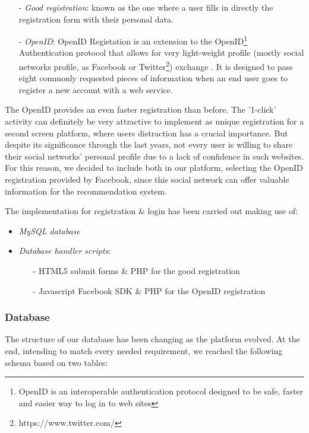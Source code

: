 \documentclass{acm_proc_article-sp}
\begin{document}
\begin{itemize}
  	\item [-]\textit{Good registration}: known as the one where a user fills in directly the registration form with their personal data. 
	\item [-]\textit{OpenID}: OpenID Registation is an extension to the OpenID\footnote{OpenID is an interoperable authentication protocol designed to be safe, faster and easier way to log in to web sites} Authentication protocol that allows for very light-weight profile (mostly social networks profile, as Facebook or Twitter\footnote{https://www.twitter.com/}) exchange . It is designed to pass eight commonly requested pieces of information when an end user goes to register a new account with a web service. 
\end{itemize}

The OpenID provides an even faster registration than before. The '1-click' activity can definitely be very attractive to implement as unique registration for a second screen platform\cite{allen2012smashing}, where users distraction has a crucial importance. But despite its significance through the last years, not every user is willing to share their social networks' personal profile due to a lack of confidence in such websites\cite{pu2006trust}. For this reason, we decided to include both in our platform, selecting the OpenID registration provided by Facebook, since this social network can offer valuable information for the recommendation system. 


The implementation for registration \& login has been carried out making use of:

\begin{itemize}
  	\item \textit{MySQL database}
	\item \textit{Database handler scripts}: 
	\begin{itemize}
  		\item [-]HTML5 submit forms \& PHP for the good registration 
		\item [-]Javascript Facebook SDK \& PHP for the OpenID registration 
	\end{itemize}
\end{itemize}

\subsubsection{Database}

The structure of our database has been changing as the platform evolved. At the end, intending to match every needed requirement, we reached the following schema based on two tables:
\end{document}
